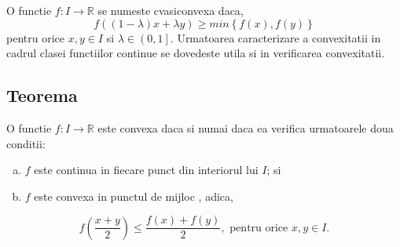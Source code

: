 \documentclass[a4paper,12pt,oneside]{report}
\begin{document}
O functie \(f: I \rightarrow \mathbb{R}\) se numeste cvasiconvexa daca,
 \begin{displaymath}
  f\left ( \left ( 1-\lambda  \right )x + \lambda y \right )\geq  min\left \{ f\left ( x \right ), f\left ( y \right ) \right \}
\end{displaymath} 
pentru orice  \(x, y \in I\) si \(\lambda  \in \left ( 0,1 \right ]\).
	 Urmatoarea caracterizare a convexitatii in cadrul clasei functiilor continue se dovedeste utila si in verificarea convexitatii. 

\subsection{Teorema}
O functie \(f : I \rightarrow \mathbb{R}\) este convexa daca si numai daca ea verifica urmatoarele doua conditii:
\begin{enumerate}[a)]
\item \(f\) este continua in fiecare punct din interiorul lui \(I\); si
\item \(f\) este convexa in punctul de mijloc , adica, 
\end{enumerate}

\begin{displaymath}
  f\left ( \frac{x+y}{2} \right )\leq \frac{f\left ( x \right )+f\left ( y \right )}{2} , \text{ pentru orice } x, y \in I.
\end{displaymath}
\end{document}
